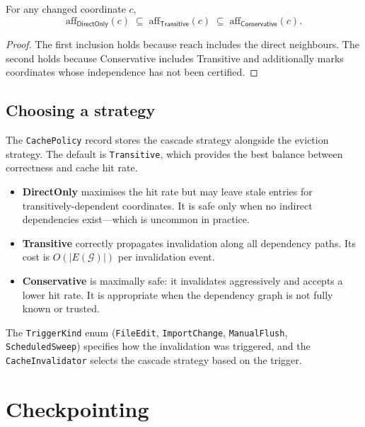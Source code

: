 \documentclass[11pt]{article}
\newcommand{\DepGraph}{\mathcal{G}}                %
\newcommand{\reachable}{\mathrm{reach}}            %
\newcommand{\affected}{\mathrm{aff}}               %
\begin{document}
\begin{proposition}\label{prop:cascade-order}
For any changed coordinate $c$,
\[
  \affected_{\mathsf{DirectOnly}}(c)
  \;\subseteq\;
  \affected_{\mathsf{Transitive}}(c)
  \;\subseteq\;
  \affected_{\mathsf{Conservative}}(c).
\]
\end{proposition}
\begin{proof}
The first inclusion holds because $\reachable$ includes the direct
neighbours.  The second holds because Conservative includes
Transitive and additionally marks coordinates whose independence
has not been certified.
\end{proof}

\subsection{Choosing a strategy}

The \texttt{CachePolicy} record stores the cascade strategy alongside
the eviction strategy.  The default is \texttt{Transitive}, which
provides the best balance between correctness and cache hit rate.

\begin{itemize}
\item \textbf{DirectOnly} maximises the hit rate but may leave stale
  entries for transitively-dependent coordinates.  It is safe only when
  no indirect dependencies exist---which is uncommon in practice.
\item \textbf{Transitive} correctly propagates invalidation along all
  dependency paths.  Its cost is $O(|E(\DepGraph)|)$ per invalidation
  event.
\item \textbf{Conservative} is maximally safe: it invalidates
  aggressively and accepts a lower hit rate.  It is appropriate when
  the dependency graph is not fully known or trusted.
\end{itemize}

The \texttt{TriggerKind} enum (\texttt{FileEdit}, \texttt{ImportChange},
\texttt{ManualFlush}, \texttt{ScheduledSweep}) specifies how the
invalidation was triggered, and the \texttt{CacheInvalidator} selects
the cascade strategy based on the trigger.

\section{Checkpointing}\label{sec:checkpointing}
\end{document}
